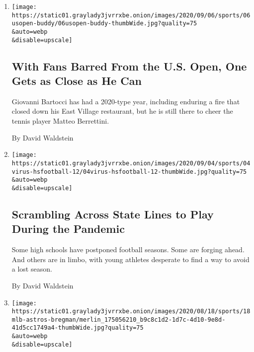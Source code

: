 \begin{enumerate}
\def\labelenumi{\arabic{enumi}.}
\item
  \href{/2020/09/06/sports/tennis/US-Open-Matteo-Berrettini-fan.html}{}

  \texttt{[image: https://static01.graylady3jvrrxbe.onion/images/2020/09/06/sports/06usopen-buddy/06usopen-buddy-thumbWide.jpg?quality=75\\\&auto=webp\\\&disable=upscale]}

  \hypertarget{with-fans-barred-from-the-us-open-one-gets-as-close-as-he-can}{%
  \subsection{With Fans Barred From the U.S. Open, One Gets as Close as
  He
  Can}\label{with-fans-barred-from-the-us-open-one-gets-as-close-as-he-can}}

  Giovanni Bartocci has had a 2020-type year, including enduring a fire
  that closed down his East Village restaurant, but he is still there to
  cheer the tennis player Matteo Berrettini.

  By David Waldstein
\item
  \href{/2020/09/03/sports/ncaafootball/high-school-football-coronavirus-pandemic.html}{}

  \texttt{[image: https://static01.graylady3jvrrxbe.onion/images/2020/09/04/sports/04virus-hsfootball-12/04virus-hsfootball-12-thumbWide.jpg?quality=75\\\&auto=webp\\\&disable=upscale]}

  \hypertarget{scrambling-across-state-lines-to-play-during-the-pandemic}{%
  \subsection{Scrambling Across State Lines to Play During the
  Pandemic}\label{scrambling-across-state-lines-to-play-during-the-pandemic}}

  Some high schools have postponed football seasons. Some are forging
  ahead. And others are in limbo, with young athletes desperate to find
  a way to avoid a lost season.

  By David Waldstein
\item
  \href{/2020/08/18/sports/baseball/houston-astros-joe-kelly-cheating.html}{}

  \texttt{[image: https://static01.graylady3jvrrxbe.onion/images/2020/08/18/sports/18mlb-astros-bregman/merlin\_175056210\_b9c8c1d2-1d7c-4d10-9e8d-41d5cc1749a4-thumbWide.jpg?quality=75\\\&auto=webp\\\&disable=upscale]}


\end{enumerate}
